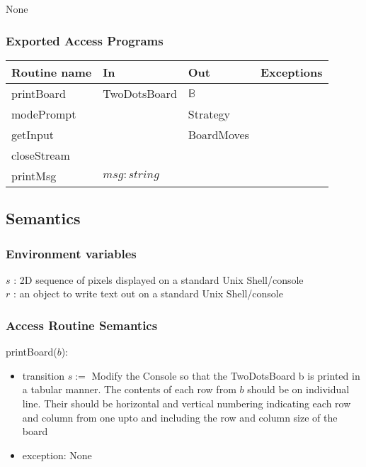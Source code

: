 \documentclass[12pt]{article}
\begin{document}
None

\subsubsection* {Exported Access Programs}

\begin{tabular}{| l | l | l | p{6cm} |}
\hline
\textbf{Routine name} & \textbf{In} & \textbf{Out} & \textbf{Exceptions}\\
\hline
printBoard & TwoDotsBoard & $\mathbb{B}$& \\
\hline
modePrompt &  & Strategy & \\
\hline
getInput &  & BoardMoves & \\
\hline
closeStream &  &  & \\
\hline
printMsg & $msg : string$ &  & \\
\hline

\end{tabular}

\subsection* {Semantics}

\subsubsection* {Environment variables}
\noindent $s$ : 2D sequence of pixels displayed on a standard Unix Shell/console\\
\noindent $r$ : an object to write text out on a standard Unix Shell/console\\

\subsubsection* {Access Routine Semantics}

\noindent printBoard($b$): 
\begin{itemize}
\item transition $s:=$ Modify the Console so that the TwoDotsBoard b is printed in a tabular manner. The contents of each row from $b$ should
be on individual line. Their should be horizontal and vertical numbering indicating each row and column from one upto and including the row and column size of the board
\item exception: None
\end{itemize}
\end{document}
